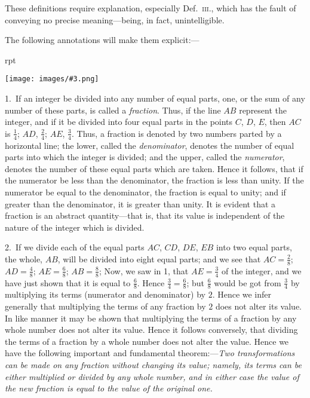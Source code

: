 \documentclass[oneside]{book}
\newcounter{wrapwidth}
\newcommand\imgflow[3]{
\setcounter{wrapwidth}{#1}
\begin{wrapfigure}[#2]{r}{\value{wrapwidth}pt}
\begin{center}
\vspace{-0.3in}
\texttt{[image: images/\#3.png]}
\end{center}
\end{wrapfigure}
}
\begin{document}
These definitions require explanation, especially
Def.~\textsc{iii.}, which has the fault of conveying no precise
meaning---being, in fact, unintelligible.

The following annotations will make them explicit:---\par\smallskip

\imgflow{153}{2}{f256}

\begin{footnotesize}
1.~If an integer be divided into any number of equal parts,
one, or the sum of any number of these parts, is called a \emph{fraction}.
Thus, if the line $AB$ represent
the integer, and if it be divided
into four equal parts in the
points $C$, $D$, $E$, then $AC$ is $\frac{1}{4}$;
$AD$, $\frac{2}{4}$; $AE$, $\frac{3}{4}$. Thus, a fraction is denoted by two numbers
parted by a horizontal line; the lower, called the \emph{denominator},
denotes the number of equal parts into which the integer is divided;
and the upper, called the \emph{numerator}, denotes the number
of these equal parts which are taken. Hence it follows, that if
the numerator be less than the denominator, the fraction is less
than unity. If the numerator be equal to the denominator, the
fraction is equal to unity; and if greater than the denominator, it
is greater than unity. It is evident that a fraction is an abstract
quantity---that is, that its value is independent of the nature of
the integer which is divided.

2.~If we divide each of the equal parts $AC$, $CD$, $DE$, $EB$ into
two equal parts, the whole, $AB$, will be divided into eight equal
parts; and we see that $AC = \frac{2}{8}$; $AD = \frac{4}{8}$; $AE = \frac{6}{8}$; $AB = \frac{8}{8}$;
Now, we saw in 1, that $AE = \frac{3}{4}$ of the integer, and we have just
shown that it is equal to $\frac{6}{8}$. Hence $\frac{3}{4}=\frac{6}{8}$; but $\frac{6}{8}$ would be got
from $\frac{3}{4}$ by multiplying its terms (numerator and denominator)
by $2$. Hence we infer generally that multiplying the terms of
any fraction by $2$ does not alter its value. In like manner it
may be shown that multiplying the terms of a fraction by any
whole number does not alter its value. Hence it follows conversely,
that dividing the terms of a fraction by a whole number
does not alter the value. Hence we have the following important
and fundamental theorem:---\textit{Two transformations can be made on
any fraction without changing its value; namely, its terms can be
either multiplied or divided by any whole number, and in either
case the value of the new fraction is equal to the value of the
original one.}


\end{footnotesize}
\end{document}
